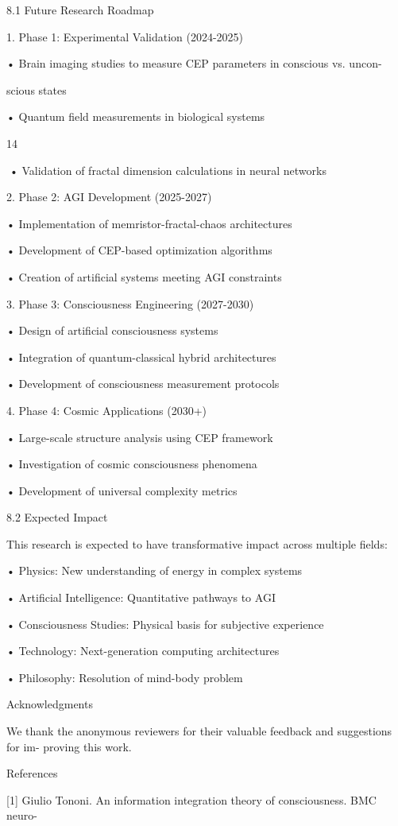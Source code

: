 8.1 Future Research Roadmap

1. Phase 1: Experimental Validation (2024-2025)

• Brain imaging studies to measure CEP parameters in conscious vs. uncon-

scious states

• Quantum field measurements in biological systems

14

• Validation of fractal dimension calculations in neural networks

2. Phase 2: AGI Development (2025-2027)

• Implementation of memristor-fractal-chaos architectures

• Development of CEP-based optimization algorithms

• Creation of artificial systems meeting AGI constraints

3. Phase 3: Consciousness Engineering (2027-2030)

• Design of artificial consciousness systems

• Integration of quantum-classical hybrid architectures

• Development of consciousness measurement protocols

4. Phase 4: Cosmic Applications (2030+)

• Large-scale structure analysis using CEP framework

• Investigation of cosmic consciousness phenomena

• Development of universal complexity metrics

8.2 Expected Impact

This research is expected to have transformative impact across multiple fields:

• Physics: New understanding of energy in complex systems

• Artificial Intelligence: Quantitative pathways to AGI

• Consciousness Studies: Physical basis for subjective experience

• Technology: Next-generation computing architectures

• Philosophy: Resolution of mind-body problem

Acknowledgments

We thank the anonymous reviewers for their valuable feedback and suggestions for im-
proving this work.

References

[1] Giulio Tononi. An information integration theory of consciousness. BMC neuro-

